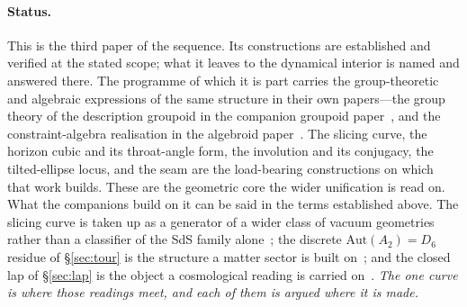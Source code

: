 \documentclass[11pt,a4paper]{article}
\theoremstyle{definition}
\begin{document}
\paragraph{Status.} This is the third paper of the sequence. Its constructions are established and verified at the stated scope; what it leaves to the dynamical interior is named and answered there. The programme of which it is part carries the group-theoretic and algebraic expressions of the same structure in their own papers---the group theory of the description groupoid in the companion groupoid paper~\cite{JanzenGroupoid}, and the constraint-algebra realisation in the algebroid paper~\cite{JanzenAlgebroid}. The slicing curve, the horizon cubic and its throat-angle form, the involution and its conjugacy, the tilted-ellipse locus, and the seam are the load-bearing constructions on which that work builds. These are the geometric core the wider unification is read on. What the companions build on it can be said in the terms established above. The slicing curve is taken up as a generator of a wider class of vacuum geometries rather than a classifier of the SdS family alone~\cite{JanzenOperator,JanzenRange}; the discrete $\mathrm{Aut}(A_{2})=D_{6}$ residue of \S\ref{sec:tour} is the structure a matter sector is built on~\cite{JanzenMatter,JanzenGeometricCore}; and the closed lap of \S\ref{sec:lap} is the object a cosmological reading is carried on~\cite{JanzenCRframework}. \emph{The one curve is where those readings meet, and each of them is argued where it is made.}
\end{document}
